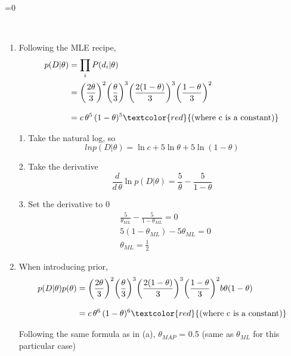 \documentclass [11pt]{article}
\def\answers{0}
\newcommand{\answer}[1]{\ifnum\answers=0{\color{red}{\bf Answer:}\\\it{#1}}\fi}
\begin{document}
\begin{enumerate}
\answer{
\begin{enumerate}
\item Following the MLE recipe,\\
\begin{align*}
p(D | \theta) &= \prod_i P(d_i | \theta)\\
&= {\left ( \frac{2 \theta} {3} \right )}^2 {\left ( \frac{\theta} {3} \right )}^3 {\left ( \frac{2 (1-\theta)} {3} \right )}^3 {\left ( \frac{1 - \theta} {3} \right )}^2\\[8pt]
&= c \, \theta^5 \, (1-\theta)^5 \textcolor{red}{\text{(where c is a constant)}}
\end{align*}

1. Take the natural log, so
\begin{equation*}
ln p(D|\theta) = \ln c + 5 \ln \theta + 5 \ln (1-\theta) 
\end{equation*}

2. Take the derivative
\begin{equation*}
\frac{d}{d\, \theta}{\ln p(D|\theta)} = \frac{5}{\theta} - \frac{5}{1-\theta}
\end{equation*}

3. Set the derivative to 0
\begin{align*}
&\frac{5}{\theta_{ML}} - \frac{5}{1-\theta_{ML}} = 0 \\[8pt]
&5(1-\theta_{ML}) - 5\theta_{ML} = 0\\[8pt]
&\theta_{ML} = \frac{1}{2}
\end{align*}

\item When introducing prior,
\begin{align*}
p(D | \theta) p(\theta) &= {\left ( \frac{2 \theta} {3} \right )}^2 {\left ( \frac{\theta} {3} \right )}^3 {\left ( \frac{2 (1-\theta)} {3} \right )}^3 {\left ( \frac{1 - \theta} {3} \right )}^2 b \theta (1-\theta)\\[8pt]
&= c \, \theta^6 \, (1-\theta)^6 \textcolor{red}{\text{(where c is a constant)}}
\end{align*}

Following the same formula as in (a), $\theta_{MAP}$ = 0.5 (same as $\theta_{ML}$ for this particular case)

\end{enumerate}
}

\end{enumerate}
\end{document}
